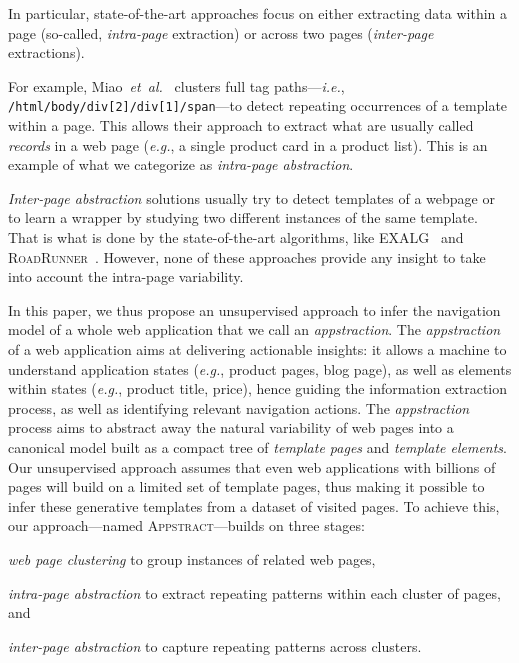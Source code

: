 In particular, state-of-the-art approaches focus on either extracting data within a page (so-called, \emph{intra-page} extraction) or across two pages (\emph{inter-page} extractions). 

For example, Miao~\textit{et~al.}~\cite{MiaoExtractingClustering} clusters full tag paths---\emph{i.e.}, \texttt{/html/bo\-dy/div[2]/div[1]/span}---to detect repeating occurrences of a template within a page.
This allows their approach to extract what are usually called \emph{records} in a web page (\emph{e.g.}, a single product card in a product list).
This is an example of what we categorize as \emph{intra-page abstraction}.

\emph{Inter-page abstraction} solutions usually try to detect templates of a webpage or to learn a wrapper by studying two different instances of the same template.
That is what is done by the state-of-the-art algorithms, like EXALG~\cite{ArasuExtractingPages} and \textsc{RoadRunner}~\cite{Crescenzi2001RoadRunner:Sites}.
However, none of these approaches provide any insight to take into account the intra-page variability.

In this paper, we thus propose an unsupervised approach to infer the navigation model of a whole web application that we call an \textit{appstraction}.
The \textit{appstraction} of a web application aims at delivering actionable insights: it allows a machine to understand application states (\emph{e.g.}, product pages, blog page), as well as elements within states (\emph{e.g.}, product title, price), hence guiding the information extraction process, as well as identifying relevant navigation actions.
The \textit{appstraction} process aims to abstract away the natural variability of web pages into a canonical model built as a compact tree of \emph{template pages} and \emph{template elements}.
Our unsupervised approach assumes that even web applications with billions of pages will build on a limited set of template pages, thus making it possible to infer these generative templates from a dataset of visited pages.
To achieve this, our approach---named \textsc{Appstract}---builds on three stages:
\begin{inparaenum}
    \item \textit{web page clustering} to group instances of related web pages,
    \item \textit{intra-page abstraction} to extract repeating patterns within each cluster of pages, and
    \item \textit{inter-page abstraction} to capture repeating patterns across clusters.
\end{inparaenum}

